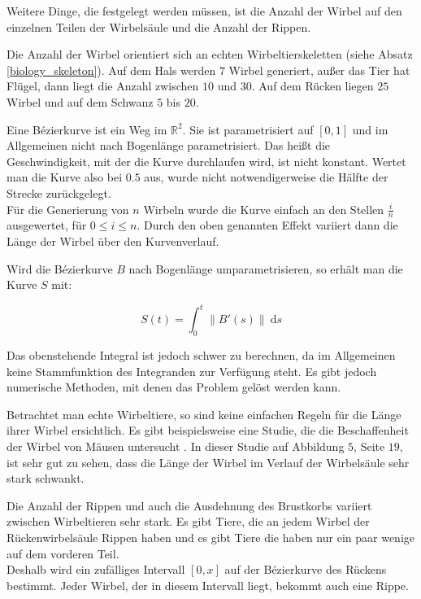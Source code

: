 Weitere Dinge, die festgelegt werden müssen, ist die Anzahl der Wirbel auf den einzelnen Teilen der Wirbelsäule und die Anzahl der Rippen.

Die Anzahl der Wirbel orientiert sich an echten Wirbeltierskeletten (siehe Absatz \ref{biology_skeleton}). Auf dem Hals werden $7$ Wirbel generiert, außer das Tier hat Flügel, dann liegt die Anzahl zwischen $10$ und $30$. Auf dem Rücken liegen $25$ Wirbel und auf dem Schwanz $5$ bis $20$.

Eine Bézierkurve ist ein Weg im $\mathbb{R}^2$. Sie ist parametrisiert auf $[0, 1]$ und im Allgemeinen nicht nach Bogenlänge parametrisiert. Das heißt die Geschwindigkeit, mit der die Kurve durchlaufen wird, ist nicht konstant. Wertet man die Kurve also bei $0.5$ aus, wurde nicht notwendigerweise die Hälfte der Strecke zurückgelegt.\\
Für die Generierung von $n$ Wirbeln wurde die Kurve einfach an den Stellen $\frac{i}{n}$ ausgewertet, für $0 \leq i \leq n$. Durch den oben genannten Effekt variiert dann die Länge der Wirbel über den Kurvenverlauf.

Wird die Bézierkurve $B$ nach Bogenlänge umparametrisieren, so erhält man die Kurve $S$ mit:

\[S(t) = \int_0^t \| B'(s) \| ~\mathrm{d}s \]

Das obenstehende Integral ist jedoch schwer zu berechnen, da im Allgemeinen keine Stammfunktion des Integranden zur Verfügung steht. Es gibt jedoch numerische Methoden, mit denen das Problem gelöst werden kann. \cite{ArcLengthParametrization}

Betrachtet man echte Wirbeltiere, so sind keine einfachen Regeln für die Länge ihrer Wirbel ersichtlich. Es gibt beispielsweise eine Studie, die die Beschaffenheit der  Wirbel von Mäusen untersucht \cite{MouseVertebrae}. In dieser Studie auf Abbildung $5$, Seite $19$, ist sehr gut zu sehen, dass die Länge der Wirbel im Verlauf der Wirbelsäule sehr stark schwankt.



Die Anzahl der Rippen und auch die Ausdehnung des Brustkorbs variiert zwischen Wirbeltieren sehr stark. Es gibt Tiere, die an jedem Wirbel der Rückenwirbelsäule Rippen haben und es gibt Tiere die haben nur ein paar wenige auf dem vorderen Teil.
\\
Deshalb wird ein zufälliges Intervall $[0, x]$ auf der Bézierkurve des Rückens bestimmt. Jeder Wirbel, der in diesem Intervall liegt, bekommt auch eine Rippe.


